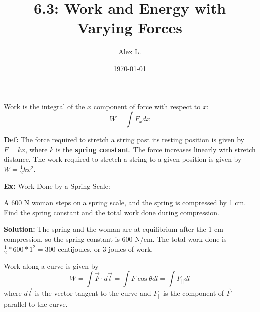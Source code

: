 \documentclass{article}
\title{6.3: Work and Energy with Varying Forces}
\author{Alex L.}
\date{\today}
\begin{document}
\maketitle
Work is the integral of the $x$ component of force with respect to $x$:
$$W = \int F_x dx$$

\textbf{Def:} The force required to stretch a string past its resting position is given by $F = kx$, where $k$ is the \textbf{spring constant}. The force increases linearly with stretch distance. The work required to stretch a string to a given position is given by $W = \frac{1}{2}kx^2$.

\textbf{Ex:} Work Done by a Spring Scale:

A $600$ N woman steps on a spring scale, and the spring is compressed by 1 cm. Find the spring constant and the total work done during compression. 

\textbf{Solution:} The spring and the woman are at equilibrium after the 1 cm compression, so the spring constant is $600$ N/cm. The total work done is $\frac{1}{2}*600*1^2 = 300$ centijoules, or $3$ joules of work.  

Work along a curve is given by $$W = \int \vec{F} \cdot d\vec{l} = \int F \cos\theta dl = \int F_{\vert\vert} dl$$where $d\vec{l}$ is the vector tangent to the curve and $F_{\vert\vert}$ is the component of $\vec{F}$ parallel to the curve. 
\end{document}

